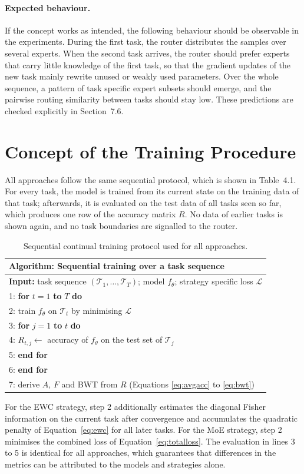 \paragraph{Expected behaviour.} If the concept works as intended, the
following behaviour should be observable in the experiments. During the
first task, the router distributes the samples over several experts. When
the second task arrives, the router should prefer experts that carry little
knowledge of the first task, so that the gradient updates of the new task
mainly rewrite unused or weakly used parameters. Over the whole sequence,
a pattern of task specific expert subsets should emerge, and the pairwise
routing similarity between tasks should stay low. These predictions are
checked explicitly in Section~7.6.

\section{Concept of the Training Procedure}
\label{sec:trainingdesign}

All approaches follow the same sequential protocol, which is shown in
Table~4.1. For every task, the model is trained from its current state on
the training data of that task; afterwards, it is evaluated on the test
data of all tasks seen so far, which produces one row of the accuracy
matrix $R$. No data of earlier tasks is shown again, and no task boundaries
are signalled to the router.

\begin{table}[H]
\centering
\caption{Sequential continual training protocol used for all approaches.}
\label{tab:protocol}
\begin{tabular}{p{}}
\toprule
\textbf{Algorithm:} Sequential training over a task sequence \\
\midrule
\textbf{Input:} task sequence $(\mathcal{T}_1, \dots, \mathcal{T}_T)$;
model $f_\theta$; strategy specific loss $\mathcal{L}$ \\
1: \textbf{for} $t = 1$ \textbf{to} $T$ \textbf{do} \\
2: \quad train $f_\theta$ on $\mathcal{T}_t$ by minimising $\mathcal{L}$ \\
3: \quad \textbf{for} $j = 1$ \textbf{to} $t$ \textbf{do} \\
4: \quad \quad $R_{t,j} \leftarrow$ accuracy of $f_\theta$ on the test set of $\mathcal{T}_j$ \\
5: \quad \textbf{end for} \\
6: \textbf{end for} \\
7: derive $A$, $F$ and BWT from $R$ (Equations \eqref{eq:avgacc} to \eqref{eq:bwt}) \\
\bottomrule
\end{tabular}
\end{table}

For the EWC strategy, step 2 additionally estimates the diagonal Fisher
information on the current task after convergence and accumulates the
quadratic penalty of Equation~\eqref{eq:ewc} for all later tasks. For the
MoE strategy, step 2 minimises the combined loss of
Equation~\eqref{eq:totalloss}. The evaluation in lines 3 to 5 is identical
for all approaches, which guarantees that differences in the metrics can be
attributed to the models and strategies alone.
